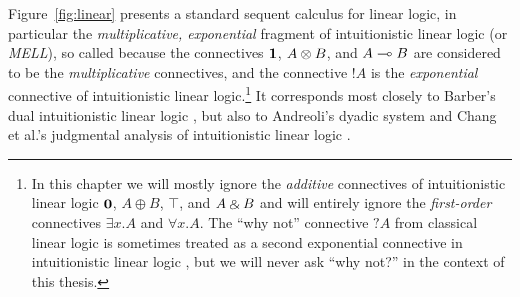 

Figure~\ref{fig:linear} presents a standard sequent calculus for
linear logic, in particular the {\it multiplicative, exponential}
fragment of intuitionistic linear logic (or {\it MELL}), so called
because the connectives $\mathbf{1}$, $A \otimes B$, and $A \multimap B$ are
considered to be the {\it multiplicative} connectives, and the
connective ${!}A$ is the {\it exponential} connective of
intuitionistic linear logic.\footnote{In this chapter we will mostly
  ignore the {\it additive} connectives of intuitionistic linear logic
  $\mathbf{0}$, $A \oplus B$, $\top$, and $A \mathbin{\binampersand} B$ and will entirely
  ignore the {\it first-order} connectives $\exists x.A$ and $\forall
  x.A$. The ``why not'' connective $\mbox{?}A$ from classical linear
  logic is sometimes treated as a second exponential connective in
  intuitionistic linear logic \cite{chang03judgmental}, but we will
  never ask ``why not?'' in the context of this thesis.} It corresponds most
closely to Barber's dual intuitionistic linear logic
\cite{barber96dual}, but also to Andreoli's dyadic system
\cite{andreoli92logic} and Chang et al.'s judgmental analysis of
intuitionistic linear logic \cite{chang03judgmental}.


